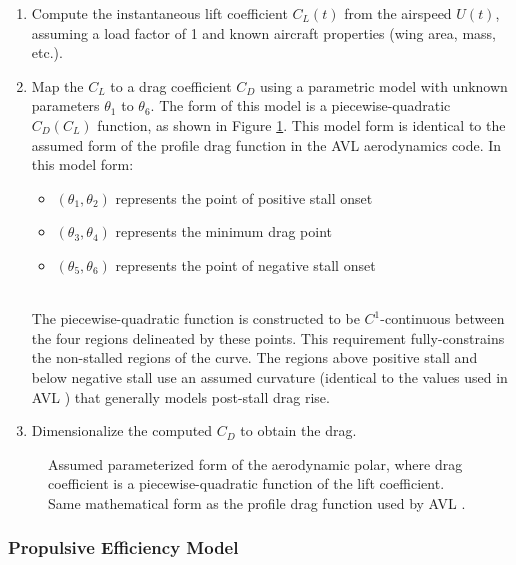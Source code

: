 \begin{enumerate}
    \item Compute the instantaneous lift coefficient $C_L(t)$ from the airspeed $U(t)$, assuming a load factor of 1 and known aircraft properties (wing area, mass, etc.).
    \item Map the $C_L$ to a drag coefficient $C_D$ using a parametric model with unknown parameters $\theta_1$ to $\theta_6$. The form of this model is a piecewise-quadratic $C_D(C_L)$ function, as shown in Figure \ref{fig:aero_polar_form}. This model form is identical to the assumed form of the profile drag function in the AVL \cite{drela_athena_2004} aerodynamics code. In this model form:\\
    \begin{itemize}
        \item $(\theta_1, \theta_2)$ represents the point of positive stall onset
        \item $(\theta_3, \theta_4)$ represents the minimum drag point
        \item $(\theta_5, \theta_6)$ represents the point of negative stall onset
    \end{itemize}
    \ \\The piecewise-quadratic function is constructed to be $C^1$-continuous between the four regions delineated by these points. This requirement fully-constrains the non-stalled regions of the curve. The regions above positive stall and below negative stall use an assumed curvature (identical to the values used in AVL \cite{drela_athena_2004}) that generally models post-stall drag rise.

    \item Dimensionalize the computed $C_D$ to obtain the drag.
\end{enumerate}

\begin{figure}[H]
    \centering
    
    \caption{Assumed parameterized form of the aerodynamic polar, where drag coefficient is a piecewise-quadratic function of the lift coefficient. Same mathematical form as the profile drag function used by AVL \cite{drela_athena_2004}.}
    \label{fig:aero_polar_form}
\end{figure}

\subsubsection{Propulsive Efficiency Model}
\label{subsubsec:propulsive_efficiency_model}

